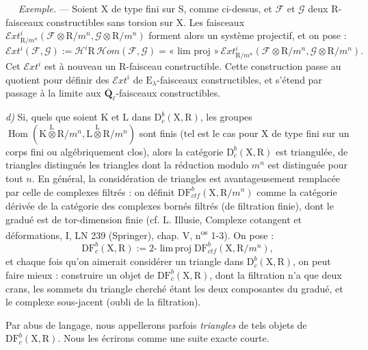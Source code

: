 \documentclass[11pt,leqno]{article}
\newcommand{\Page}[1]{\ifvmode\noindent\else\unskip\ \fi{\footnotesize\textcolor{gray}{[p.\,#1]}}\ \ignorespaces}
\begin{document}
\Page{149}
\textit{Exemple.} — Soient \(\mathrm{X}\) de type fini sur \(\mathrm{S}\), comme ci-dessus, et \(\mathscr{F}\) et \(\mathscr{G}\) deux \(\mathrm{R}\)-faisceaux constructibles sans torsion sur \(\mathrm{X}\). Les faisceaux \(\mathscr{E}xt^i_{\mathrm{R}/m^n}(\mathscr{F}\otimes\mathrm{R}/m^n,\mathscr{G}\otimes\mathrm{R}/m^n)\) forment alors un système projectif, et on pose :
\[
\mathscr{E}xt^i(\mathscr{F},\mathscr{G})
:=\mathscr{H}^i\mathrm{R}\,\mathscr{H}om(\mathscr{F},\mathscr{G})
=\text{« lim proj »}\,\mathscr{E}xt^i_{\mathrm{R}/m^n}
(\mathscr{F}\otimes\mathrm{R}/m^n,\mathscr{G}\otimes\mathrm{R}/m^n).
\]
Cet \(\mathscr{E}xt^i\) est à nouveau un \(\mathrm{R}\)-faisceau constructible. Cette construction passe au quotient pour définir des \(\mathscr{E}xt^i\) de \(\mathrm{E}_\lambda\)-faisceaux constructibles, et s’étend par passage à la limite aux \(\overline{\mathbf{Q}}_\ell\)-faisceaux constructibles.

\textit{d)} Si, quels que soient \(\mathrm{K}\) et \(\mathrm{L}\) dans \(\mathrm{D}_c^b(\mathrm{X},\mathrm{R})\), les groupes \(\operatorname{Hom}(\mathrm{K}\overset{\mathrm{L}}{\otimes}\mathrm{R}/m^n,\mathrm{L}\overset{\mathrm{L}}{\otimes}\mathrm{R}/m^n)\) sont finis (tel est le cas pour \(\mathrm{X}\) de type fini sur un corps fini ou algébriquement clos), alors la catégorie \(\mathrm{D}_c^b(\mathrm{X},\mathrm{R})\) est triangulée, de triangles distingués les triangles dont la réduction modulo \(m^n\) est distinguée pour tout \(n\). En général, la considération de triangles est avantageusement remplacée par celle de complexes filtrés : on définit \(\mathrm{DF}_{\mathit{ctf}}^b(\mathrm{X},\mathrm{R}/m^n)\) comme la catégorie dérivée de la catégorie des complexes bornés filtrés (de filtration finie), dont le gradué est de tor-dimension finie (cf. L. Illusie, Complexe cotangent et déformations, I, LN 239 (Springer), chap. V, n\textsuperscript{os} 1-3). On pose :
\[
\mathrm{DF}_c^b(\mathrm{X},\mathrm{R})
:=2\text{-}\operatorname{lim\,proj}\mathrm{DF}_{\mathit{ctf}}^b(\mathrm{X},\mathrm{R}/m^n),
\]
et chaque fois qu’on aimerait considérer un triangle dans \(\mathrm{D}_c^b(\mathrm{X},\mathrm{R})\), on peut faire mieux : construire un objet de \(\mathrm{DF}_c^b(\mathrm{X},\mathrm{R})\), dont la filtration n’a que deux crans, les sommets du triangle cherché étant les deux composantes du gradué, et le complexe sous-jacent (oubli de la filtration).

Par abus de langage, nous appellerons parfois \textit{triangles} de tels objets de \(\mathrm{DF}_c^b(\mathrm{X},\mathrm{R})\). Nous les écrirons comme une suite exacte courte.
\end{document}
